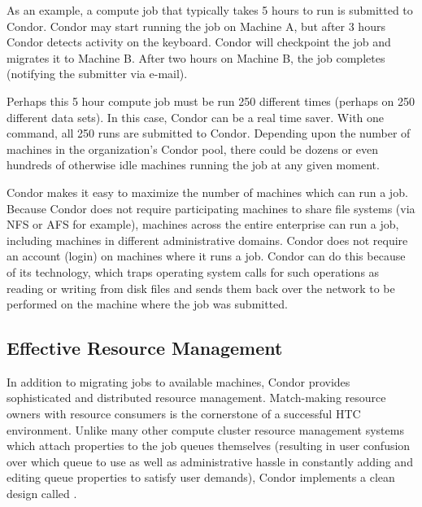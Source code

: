 As an example, a compute job that typically takes 5
hours to run is submitted to Condor.
Condor may start running the job on Machine A, but after 3
hours Condor detects activity on the keyboard.
Condor will checkpoint
the job and migrates it to Machine B.
After two hours on Machine B,
the job completes (notifying the submitter via e-mail). 

Perhaps this 5 hour compute job must be run 250 different times
(perhaps on 250 different data sets).
In this case, Condor can be a real time saver.
With one command, all 250 runs are submitted to Condor.
Depending upon the number of machines in the organization's Condor
pool, there could be dozens or even hundreds of otherwise idle machines
running the job at any given moment.

Condor makes it easy to maximize the number of machines which can run
a job. Because Condor does not require participating machines to
share file systems (via NFS or AFS for example), machines across the
entire enterprise can run a job, including machines in different
administrative domains.
Condor does not require an
account (login) on machines where it runs a job.
Condor can do this
because of its 
technology, which traps
operating system calls for such operations as reading or writing from disk
files and sends them back over the network to be performed on the machine
where the job was submitted. 

\subsection{Effective Resource Management}

In addition to migrating jobs to available machines, Condor provides
sophisticated and distributed resource management.
Match-making resource
owners with resource consumers is the cornerstone of a successful HTC
environment.
Unlike many other compute cluster resource management
systems which attach properties to the job queues themselves (resulting
in user confusion over which queue to use as well as administrative
hassle in constantly adding and editing queue properties to satisfy user
demands), Condor implements a clean design called . 

